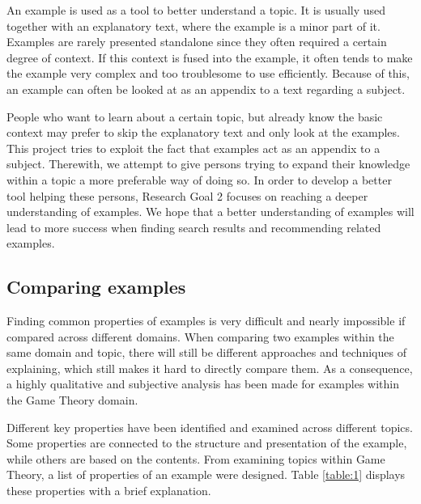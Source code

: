 An example is used as a tool to better understand a topic. It is usually used together with an explanatory text, where the example is a minor part of it. Examples are rarely presented standalone since they often required a certain degree of context. If this context is fused into the example, it often tends to make the example very complex and too troublesome to use efficiently. Because of this, an example can often be looked at as an appendix to a text regarding a subject. 

People who want to learn about a certain topic, but already know the basic context may prefer to skip the explanatory text and only look at the examples. This project tries to exploit the fact that examples act as an appendix to a subject. Therewith, we attempt to give persons trying to expand their knowledge within a topic a more preferable way of doing so. In order to develop a better tool helping these persons, Research Goal 2 focuses on reaching a deeper understanding of examples. We hope that a better understanding of examples will lead to more success when finding search results and recommending related examples.

\subsection{Comparing examples} \label{comparing_examples}

Finding common properties of examples is very difficult and nearly impossible if  compared across different domains. When comparing two examples within the same domain and topic, there will still be different approaches and techniques of explaining, which still makes it hard to directly compare them. As a consequence, a highly qualitative and subjective analysis has been made for examples within the Game Theory domain. 

Different key properties have been identified and examined across different topics. Some properties are connected to the structure and presentation of the example, while others are based on the contents. From examining topics within Game Theory, a list of properties of an example were designed. Table \ref{table:1} displays these properties with a brief explanation.

